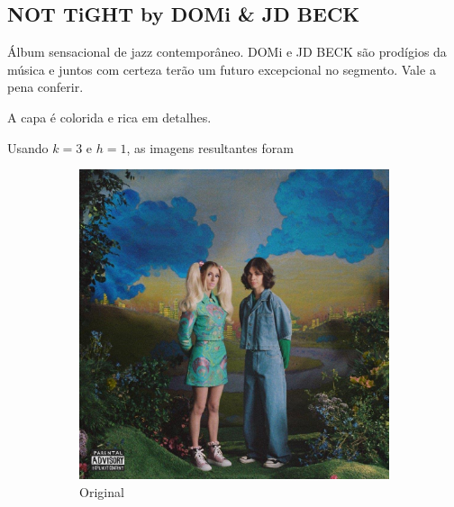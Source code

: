 \documentclass{article}
\begin{document}
\subsection{NOT TiGHT by DOMi \& JD BECK}
\label{subsec:nottight}

Álbum sensacional de jazz contemporâneo. DOMi e JD BECK são prodígios
da música e juntos com certeza terão um futuro excepcional no segmento.
Vale a pena conferir.

A capa é colorida e rica em detalhes.

Usando $k=3$ e $h=1$, as imagens resultantes foram
\clearpage
\begin{figure}[ht]
  \centering
  \begin{subfigure}{0.48\textwidth}
    \centering
    \includegraphics[width=\textwidth]{imagens-reais/not-tight/nottight.jpg}
    \caption{Original}
  \end{subfigure}%
  \hfill
  \begin{subfigure}{0.48\textwidth}
    \centering

\end{subfigure}
\end{figure}
\end{document}
